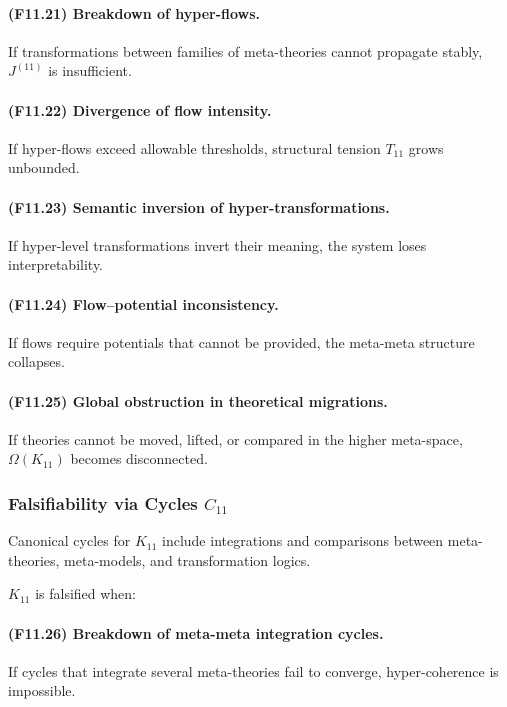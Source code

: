 \paragraph{(F11.21) Breakdown of hyper-flows.}
If transformations between families of meta-theories cannot propagate
stably, $J^{(11)}$ is insufficient.

\paragraph{(F11.22) Divergence of flow intensity.}
If hyper-flows exceed allowable thresholds,
structural tension $T_{11}$ grows unbounded.

\paragraph{(F11.23) Semantic inversion of hyper-transformations.}
If hyper-level transformations invert their meaning,
the system loses interpretability.

\paragraph{(F11.24) Flow–potential inconsistency.}
If flows require potentials that cannot be provided,
the meta-meta structure collapses.

\paragraph{(F11.25) Global obstruction in theoretical migrations.}
If theories cannot be moved, lifted, or compared in the higher meta-space,
$\Omega(K_{11})$ becomes disconnected.



\subsubsection{Falsifiability via Cycles $C_{11}$}

Canonical cycles for $K_{11}$ include integrations and comparisons between
meta-theories, meta-models, and transformation logics.

$K_{11}$ is falsified when:

\paragraph{(F11.26) Breakdown of meta-meta integration cycles.}
If cycles that integrate several meta-theories
fail to converge, hyper-coherence is impossible.

